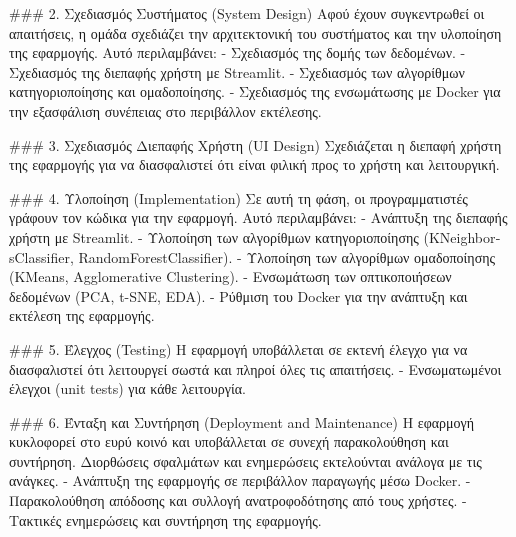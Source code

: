 \documentclass[a4paper,12pt]{article}
\begin{document}
### 2. Σχεδιασμός Συστήματος (\textlatin{System Design})
Αφού έχουν συγκεντρωθεί οι απαιτήσεις, η ομάδα σχεδιάζει την αρχιτεκτονική του συστήματος και την υλοποίηση της εφαρμογής. Αυτό περιλαμβάνει:
- Σχεδιασμός της δομής των δεδομένων.
- Σχεδιασμός της διεπαφής χρήστη με \textlatin{Streamlit}.
- Σχεδιασμός των αλγορίθμων κατηγοριοποίησης και ομαδοποίησης.
- Σχεδιασμός της ενσωμάτωσης με \textlatin{Docker} για την εξασφάλιση συνέπειας στο περιβάλλον εκτέλεσης.



\par\vspace{10pt}

### 3. Σχεδιασμός Διεπαφής Χρήστη (\textlatin{UI Design})
Σχεδιάζεται η διεπαφή χρήστη της εφαρμογής για να διασφαλιστεί ότι είναι φιλική προς το χρήστη και λειτουργική.




\par\vspace{10pt}

### 4. Υλοποίηση (\textlatin{Implementation})
Σε αυτή τη φάση, οι προγραμματιστές γράφουν τον κώδικα για την εφαρμογή. Αυτό περιλαμβάνει:
- Ανάπτυξη της διεπαφής χρήστη με \textlatin{Streamlit}.
- Υλοποίηση των αλγορίθμων κατηγοριοποίησης (\textlatin{KNeighborsClassifier}, \textlatin{RandomForestClassifier}).
- Υλοποίηση των αλγορίθμων ομαδοποίησης (\textlatin{KMeans}, \textlatin{Agglomerative Clustering}).
- Ενσωμάτωση των οπτικοποιήσεων δεδομένων (\textlatin{PCA}, \textlatin{t-SNE}, \textlatin{EDA}).
- Ρύθμιση του \textlatin{Docker} για την ανάπτυξη και εκτέλεση της εφαρμογής.



\par\vspace{10pt}

### 5. Έλεγχος (\textlatin{Testing})
Η εφαρμογή υποβάλλεται σε εκτενή έλεγχο για να διασφαλιστεί ότι λειτουργεί σωστά και πληροί όλες τις απαιτήσεις.
- Ενσωματωμένοι έλεγχοι (\textlatin{unit tests}) για κάθε λειτουργία.




\par\vspace{10pt}

### 6. Ένταξη και Συντήρηση (\textlatin{Deployment and Maintenance})
Η εφαρμογή κυκλοφορεί στο ευρύ κοινό και υποβάλλεται σε συνεχή παρακολούθηση και συντήρηση. Διορθώσεις σφαλμάτων και ενημερώσεις εκτελούνται ανάλογα με τις ανάγκες.
- Ανάπτυξη της εφαρμογής σε περιβάλλον παραγωγής μέσω \textlatin{Docker}.
- Παρακολούθηση απόδοσης και συλλογή ανατροφοδότησης από τους χρήστες.
- Τακτικές ενημερώσεις και συντήρηση της εφαρμογής.
\end{document}

